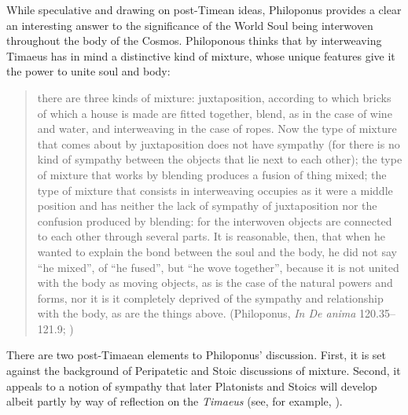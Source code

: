 While speculative and drawing on post-Timean ideas, Philoponus provides a clear an interesting answer to the significance of the World Soul being interwoven throughout the body of the Cosmos. Philoponous thinks that by interweaving Timaeus has in mind a distinctive kind of mixture, whose unique features give it the power to unite soul and body:
\begin{quote}
	there are three kinds of mixture: juxtaposition, according to which bricks of which a house is made are fitted together, blend, as in the case of wine and water, and interweaving in the case of ropes. Now the type of mixture that comes about by juxtaposition does not have sympathy (for there is no kind of sympathy between the objects that lie next to each other); the type of mixture that works by blending produces a fusion of thing mixed; the type of mixture that consists in interweaving occupies as it were a middle position and has neither the lack of sympathy of juxtaposition nor the confusion produced by blending: for the interwoven objects are connected to each other through several parts. It is reasonable, then, that when he wanted to explain the bond between the soul and the body, he did not say ``he mixed'', of ``he fused'', but ``he wove together'', because it is not united with the body as moving objects, as is the case of the natural powers and forms, nor it is it completely deprived of the sympathy and relationship with the body, as are the things above. (Philoponus, \emph{In De anima} 120.35--121.9; \citealt[41]{Eijk:2006by})
\end{quote} 
There are two post-Timaean elements to Philoponus' discussion. First, it is set against the background of Peripatetic and Stoic discussions of mixture. Second, it appeals to a notion of sympathy that later Platonists and Stoics will develop albeit partly by way of reflection on the \emph{Timaeus} (see, for example, \citealt{Emilsson:2015wf}). 

